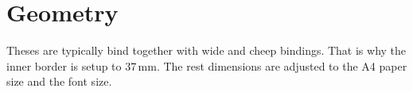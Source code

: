 \section{Geometry}
Theses are typically bind together with wide and cheep
bindings. That is why the inner border is setup to 37\,mm. The rest
dimensions are adjusted to the A4 paper size and the font size.

\endinput

